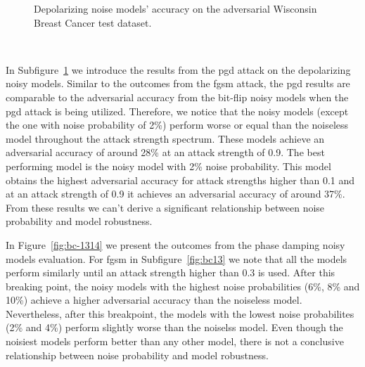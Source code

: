 \begin{figure}[!h]
\begin{subfigure}{0.45\textwidth}
      \label{fig:bc12}
  \end{subfigure}
  \caption{Depolarizing noise models' accuracy on the adversarial Wisconsin Breast Cancer test dataset.}
  \label{fig:bc-1112}
\end{figure} \

In Subfigure~\ref{fig:bc12} we introduce the results from the \ac{pgd}
attack on the depolarizing noisy models. Similar to the outcomes
from the \ac{fgsm} attack, the \ac{pgd} results are comparable to
the adversarial accuracy from the bit-flip noisy models when the \ac{pgd}
attack is being utilized. Therefore, we notice that the noisy models
(except the one with noise probability of 2\%) perform worse or equal
than the noiseless model throughout the attack strength spectrum. 
These models achieve an adversarial accuracy of around 28\% at
an attack strength of 0.9. The best performing model is the noisy
model with 2\% noise probability. This model obtains the highest
adversarial accuracy for attack strengths higher than 0.1 and
at an attack strength of 0.9 it achieves an adversarial accuracy
of around 37\%. From these results we can't derive a significant
relationship between noise probability and model robustness. \

In Figure~\ref{fig:bc-1314} we present the outcomes from the phase damping
noisy models evaluation. For \ac{fgsm} in Subfigure~\ref{fig:bc13}
we note that all the models perform similarly until an attack strength
higher than 0.3 is used. After this breaking point, the noisy models
with the highest noise probabilities (6\%, 8\% and 10\%) achieve
a higher adversarial accuracy than the noiseless model. Nevertheless,
after this breakpoint, the models with the lowest noise probabilites
(2\% and 4\%) perform slightly worse than the noiselss model. Even
though the noisiest models perform better than any other model, there
is not a conclusive relationship between noise probability and model
robustness. \

